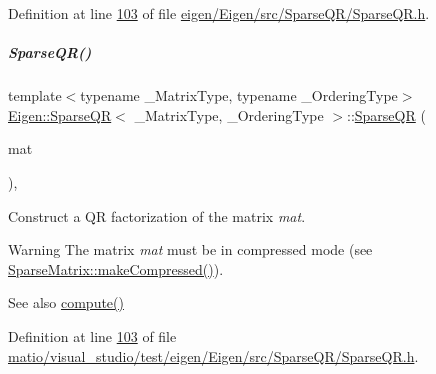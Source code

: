 Definition at line \hyperlink{eigen_2_eigen_2src_2_sparse_q_r_2_sparse_q_r_8h_source_l00103}{103} of file \hyperlink{eigen_2_eigen_2src_2_sparse_q_r_2_sparse_q_r_8h_source}{eigen/\+Eigen/src/\+Sparse\+Q\+R/\+Sparse\+Q\+R.\+h}.

\mbox{\label{group___sparse_q_r___module_ac50f705d686d4bc687ce6acbc76447d2}} 
\subparagraph{\texorpdfstring{Sparse\+Q\+R()}{SparseQR()}\hspace{0.1cm}{\footnotesize\ttfamily [2/2]}}
{\footnotesize\ttfamily template$<$typename \+\_\+\+Matrix\+Type, typename \+\_\+\+Ordering\+Type$>$ \\
\hyperlink{group___sparse_q_r___module_class_eigen_1_1_sparse_q_r}{Eigen\+::\+Sparse\+QR}$<$ \+\_\+\+Matrix\+Type, \+\_\+\+Ordering\+Type $>$\+::\hyperlink{group___sparse_q_r___module_class_eigen_1_1_sparse_q_r}{Sparse\+QR} (\begin{DoxyParamCaption}\item[{const Matrix\+Type \&}]{mat }\end{DoxyParamCaption})\hspace{0.3cm}{\ttfamily [inline]}, {\ttfamily [explicit]}}

Construct a QR factorization of the matrix {\itshape mat}.

\begin{DoxyWarning}{Warning}
The matrix {\itshape mat} must be in compressed mode (see \hyperlink{group___sparse_core___module_a5ff54ffc10296f9466dc81fa888733fd}{Sparse\+Matrix\+::make\+Compressed()}).
\end{DoxyWarning}
\begin{DoxySeeAlso}{See also}
\hyperlink{group___sparse_q_r___module_aedaf52b7543de4d55c58c8f830c2aeb7}{compute()} 
\end{DoxySeeAlso}


Definition at line \hyperlink{matio_2visual__studio_2test_2eigen_2_eigen_2src_2_sparse_q_r_2_sparse_q_r_8h_source_l00103}{103} of file \hyperlink{matio_2visual__studio_2test_2eigen_2_eigen_2src_2_sparse_q_r_2_sparse_q_r_8h_source}{matio/visual\+\_\+studio/test/eigen/\+Eigen/src/\+Sparse\+Q\+R/\+Sparse\+Q\+R.\+h}.



